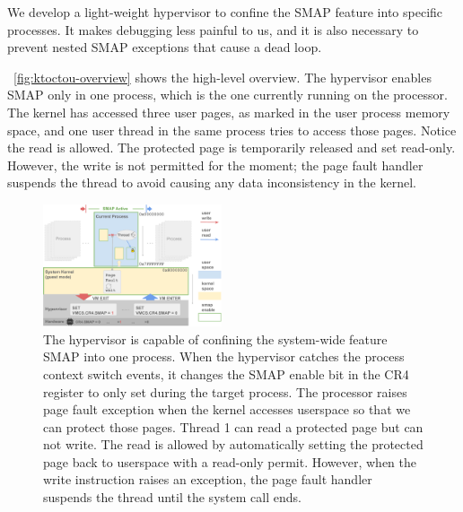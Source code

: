 We develop a light-weight hypervisor to confine the SMAP feature into specific processes. It makes debugging less painful to us, and it is also necessary to prevent nested SMAP exceptions that cause a dead loop.

~\autoref{fig:ktoctou-overview} shows the high-level overview. The hypervisor enables SMAP only in one process, which is the one currently running on the processor. The kernel has accessed three user pages, as marked in the user process memory space, and one user thread in the same process tries to access those pages. Notice the read is allowed. The protected page is temporarily released and set read-only. However, the write is not permitted for the moment; the page fault handler suspends the thread to avoid causing any data inconsistency in the kernel.

\begin{figure}[th]
  \includegraphics[width=0.47\textwidth]{figures/ktoctou-overview2}
  \centering
  \caption{The hypervisor is capable of confining the system-wide feature SMAP into one process. When the hypervisor catches the process context switch events, it changes the SMAP enable bit in the CR4 register to only set during the target process. The processor raises page fault exception when the kernel accesses userspace so that we can protect those pages. Thread 1 can read a protected page but can not write. The read is allowed by automatically setting the protected page back to userspace with a read-only permit. However, when the write instruction raises an exception, the page fault handler suspends the thread until the system call ends.}
  \label{fig:ktoctou-overview}
\end{figure}
